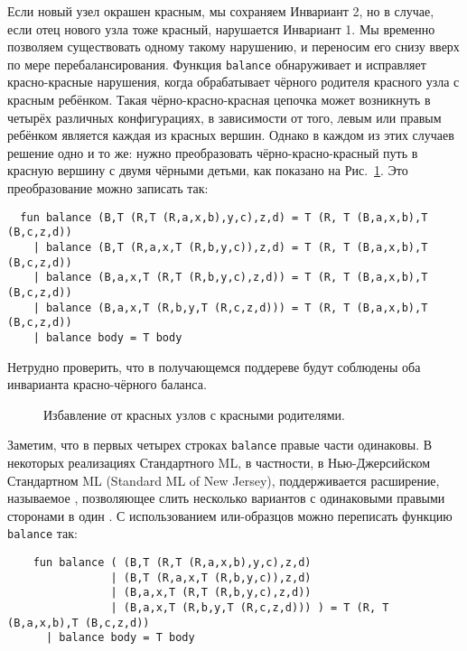 Если новый узел окрашен красным, мы сохраняем Инвариант 2, но в
случае, если отец нового узла тоже красный, нарушается Инвариант 1. Мы
временно позволяем существовать одному такому нарушению, и переносим
его снизу вверх по мере перебалансирования. Функция
\lstinline!balance! обнаруживает и исправляет красно-красные нарушения,
когда обрабатывает чёрного родителя красного узла с красным
ребёнком. Такая чёрно-красно-красная цепочка может возникнуть в
четырёх различных конфигурациях, в зависимости от того, левым или
правым ребёнком является каждая из красных вершин. Однако в каждом из
этих случаев решение одно и то же: нужно преобразовать
чёрно-красно-красный путь в красную вершину с двумя чёрными детьми,
как показано на Рис.~\ref{fig:3.5}.  Это преобразование можно записать
так:
\begin{lstlisting}
  fun balance (B,T (R,T (R,a,x,b),y,c),z,d) = T (R, T (B,a,x,b),T (B,c,z,d))
    | balance (B,T (R,a,x,T (R,b,y,c)),z,d) = T (R, T (B,a,x,b),T (B,c,z,d))
    | balance (B,a,x,T (R,T (R,b,y,c),z,d)) = T (R, T (B,a,x,b),T (B,c,z,d))
    | balance (B,a,x,T (R,b,y,T (R,c,z,d))) = T (R, T (B,a,x,b),T (B,c,z,d))
    | balance body = T body
\end{lstlisting}
Нетрудно проверить, что в получающемся поддереве будут соблюдены оба
инварианта красно-чёрного баланса.

\begin{figure}[h]
  \centering
  
  \caption{Избавление от красных узлов с красными родителями.}
  \label{fig:3.5}
\end{figure}

\begin{remark}
  Заметим, что в первых четырех строках \lstinline!balance! правые
  части одинаковы. В некоторых реализациях Стандартного ML, в
  частности, в Нью-Джерсийском Стандартном ML (Standard ML of New
  Jersey), поддерживается расширение, называемое
  , позволяющее слить несколько
  вариантов с одинаковыми правыми сторонами в один
  \cite{FahndrichBoyland1997}. С использованием или-образцов можно
  переписать функцию \lstinline!balance! так:
  \begin{lstlisting}
    fun balance ( (B,T (R,T (R,a,x,b),y,c),z,d)
                | (B,T (R,a,x,T (R,b,y,c)),z,d)
                | (B,a,x,T (R,T (R,b,y,c),z,d))
                | (B,a,x,T (R,b,y,T (R,c,z,d))) ) = T (R, T (B,a,x,b),T (B,c,z,d))
      | balance body = T body
  \end{lstlisting}
\end{remark}

